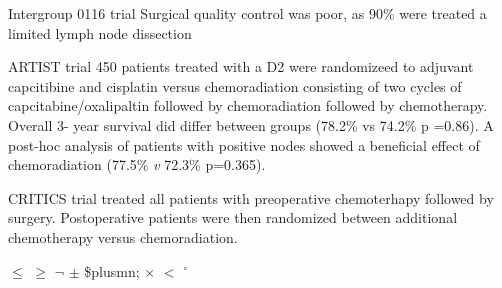 \documentclass[
]{book}
\begin{document}
Intergroup 0116 trial \citep{mcdonald725}
Surgical quality control was poor, as 90\% were treated a limited lymph node dissection

ARTIST trial 450 patients treated with a D2 were randomizeed to adjuvant capcitibine and cisplatin versus chemoradiation consisting of two cycles of capcitabine/oxalipaltin followed by chemoradiation followed by chemotherapy. Overall 3- year survival did differ between groups (78.2\% vs 74.2\% p =0.86). A post-hoc analysis of patients with positive nodes showed a beneficial effect of chemoradiation (77.5\% \emph{v} 72.3\% p=0.365).\citep{lee268}

CRITICS trial treated all patients with preoperative chemoterhapy followed by surgery. Postoperative patients were then randomized between additional chemotherapy versus chemoradiation.

\(\leq\)
\(\geq\)
\(\neg\)
\(\pm\) \$plusmn;
\(\times\)
\(<\)
\(^\circ\)

  
\end{document}
